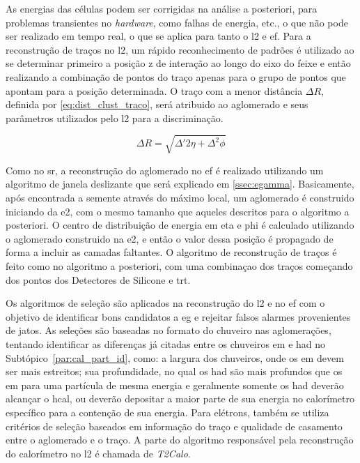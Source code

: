 As energias das células podem ser corrigidas na análise a posteriori, para
problemas transientes no \emph{hardware}, como falhas de energia, etc., o que não
pode ser realizado em tempo real, o que se aplica para tanto o \gls{l2} e
\gls{ef}. Para a reconstrução de traços no \gls{l2}, um rápido reconhecimento de
padrões é utilizado ao se determinar primeiro a posição z de interação ao longo
do eixo do feixe e então realizando a combinação de pontos do traço apenas para o grupo
de pontos que apontam para a posição determinada. O traço com a menor distância
$\Delta R$, definida por \ref{eq:dist_clust_traco}, será atribuido ao
aglomerado e seus parâmetros utilizados pelo \gls{l2} para a discriminação.

\begin{equation}\label{eq:dist_clust_traco}
\Delta R = \sqrt{\Delta'2\eta+\Delta^2\phi}
\end{equation}

Como no \gls{sr}, a reconstrução do aglomerado no \gls{ef} é realizado
utilizando um algoritmo de janela deslizante que será
explicado em \ref{ssec:egamma}. Basicamente, após encontrada
a semente através do máximo local, um aglomerado é construido iniciando da \gls{e2},
com o mesmo tamanho que aqueles descritos para o algoritmo a posteriori. O
centro de distribuição de energia em \gls{eta} e \gls{phi} é calculado
utilizando o aglomerado construido na \gls{e2}, e então o valor dessa
posição é propagado de forma a incluir as camadas faltantes. O algoritmo
de reconstrução de traços é feito como no algoritmo a posteriori, com uma
combinaçao dos traços começando dos pontos dos Detectores de Silicone e
\gls{trt}.

Os algoritmos de seleção são aplicados na reconstrução do
\gls{l2} e no \gls{ef} com o objetivo de identificar bons candidatos a \gls{eg}
e rejeitar falsos alarmes provenientes de jatos. As seleções são baseadas no
formato do chuveiro nas aglomerações, tentando identificar as diferenças já
citadas entre os chuveiros \gls{em} e \gls{had} no
Subtópico~\ref{par:cal_part_id}, como: a largura dos chuveiros, onde os \gls{em}
devem ser mais estreitos; sua profundidade, no qual os \gls{had} são mais
profundos que os \gls{em} para uma partícula de mesma energia e geralmente
somente os \gls{had} deverão alcançar o \gls{hcal}, ou deverão
depositar a maior parte de sua energia no calorímetro específico para a
contenção de sua energia. Para elétrons, também se utiliza critérios de seleção 
baseados em informação do traço e qualidade de casamento entre o aglomerado e o
traço. A parte do algoritmo responsável pela reconstrução do calorímetro no
\gls{l2} é chamada de \emph{T2Calo}.

